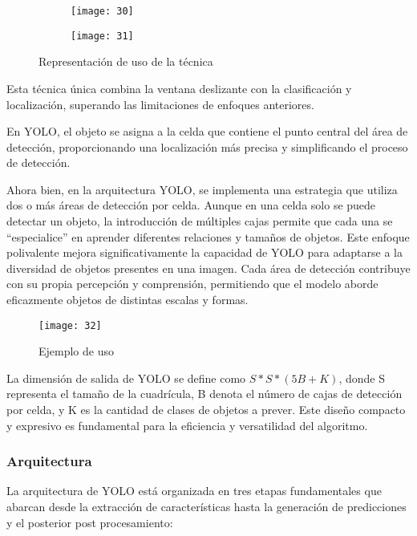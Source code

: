 	\begin{figure}[ht]
			\centering
			\begin{subfigure}[t]{.47\textwidth}
				\centering
				\texttt{[image: 30]}
			\end{subfigure}
			\begin{subfigure}[t]{.47\textwidth}
				\centering
				\texttt{[image: 31]}
			\end{subfigure}
			\caption{Representación de uso de la técnica}
			\end{figure}		
		
	Esta técnica única combina la ventana deslizante con la clasificación y localización, superando las limitaciones de enfoques anteriores.
	
	En YOLO, el objeto se asigna a la celda que contiene el punto central del área de detección, proporcionando una localización más precisa y simplificando el proceso de detección.
	
	Ahora bien, en la arquitectura YOLO, se implementa una estrategia que utiliza dos o más áreas de detección por celda. Aunque en una celda solo se puede detectar un objeto, la introducción de múltiples cajas permite que cada una se ``especialice'' en aprender diferentes relaciones y tamaños de objetos. Este enfoque polivalente mejora significativamente la capacidad de YOLO para adaptarse a la diversidad de objetos presentes en una imagen. Cada área de detección contribuye con su propia percepción y comprensión, permitiendo que el modelo aborde eficazmente objetos de distintas escalas y formas.
	
	\begin{figure}[ht]
		\centering
		\texttt{[image: 32]}
		\caption{Ejemplo de uso}
	\end{figure}
	
	La dimensión de salida de YOLO se define como $S*S*(5B+K)$, donde S representa el tamaño de la cuadrícula, B denota el número de cajas de detección por celda, y K es la cantidad de clases de objetos a prever. Este diseño compacto y expresivo es fundamental para la eficiencia y versatilidad del algoritmo.
	

	\subsubsection{Arquitectura}
	La arquitectura de YOLO está organizada en tres etapas fundamentales que abarcan desde la extracción de características hasta la generación de predicciones y el posterior post procesamiento:
		
